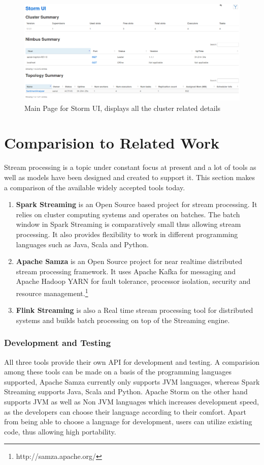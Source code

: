 \documentclass[runningheads,a4paper]{llncs}[2015/06/24]
\begin{document}
\begin{figure}
  \begin{center}
    \includegraphics[width=\textwidth]{ui-mainpage.png}
    \caption{Main Page for Storm UI, displays all the cluster related details}
    \label{fig:stormui}
   \end{center}
\end{figure}

\section{Comparision to Related Work}
 \label{sec:toolcomparision}
Stream processing is a topic under constant focus at present and a lot of tools as well as models have been designed and created to support it. This section makes a comparison of the available widely accepted tools today.
 
 \begin{enumerate}
 \item \textbf{Spark Streaming} is an Open Source based project for stream processing.  It relies on cluster computing systems and operates on batches. The batch window in Spark Streaming is comparatively small thus allowing stream processing. It also provides flexibility to work in different programming languages such as Java, Scala and Python.
 \item \textbf{Apache Samza} is an Open Source project for near realtime distributed stream processing framework. It uses Apache Kafka for messaging and Apache Hadoop YARN for fault tolerance, processor isolation, security and resource management.\footnote{http://samza.apache.org/}
 \item \textbf{Flink Streaming} is also a Real time stream processing tool for distributed systems and builds batch processing on top of the Streaming engine.
 \end{enumerate}
 
 \subsubsection{Development and Testing}
All three tools provide their own API for development and testing. A comparision among these tools can be made on a basis of the programming languages supported, Apache Samza currently only supports JVM languages, whereas Spark Streaming supports Java, Scala and Python. Apache Storm on the other hand supports JVM as well as Non JVM languages which increases development speed, as the developers can choose their language according to their comfort. Apart from being able to choose a language for development, users can utilize existing code, thus allowing high portability.
 
\end{document}
